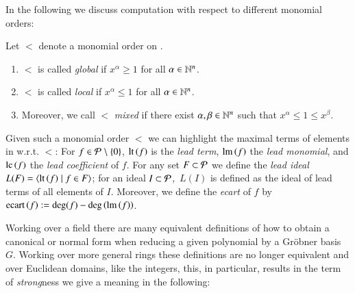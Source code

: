 In the following we discuss computation with respect to different monomial orders:
\begin{definition}
Let $<$ denote a monomial order on \epr. 
\begin{enumerate}
\item $<$ is called \emph{global} if $x^\alpha \geq 1$ for all $\alpha \in \mathbb{N}^n$.
\item $<$ is called \emph{local} if $x^\alpha \leq 1$ for all $\alpha \in \mathbb{N}^n$.
\item Moreover, we call $<$ \emph{mixed} if there exist $\alpha, \beta \in \mathbb{N}^n$ such
that $x^\alpha \leq 1 \leq x^\beta$.
\end{enumerate}
\end{definition}
Given such a monomial order $<$ we can highlight the maximal terms of
elements in \epr w.r.t. $<$: For $f\in \mathcal{P}\ \backslash\ \{0\}$,
$\operatorname{lt}\left({f}\right)$ is the \emph{lead term}, $\operatorname{lm}\left({f}\right)$ the \emph{lead monomial}, and $\mathrm{lc}\left({f}\right)$
the \emph{lead coefficient} of $f$. For any set $F \subset \mathcal{P}$ we define
the \emph{lead ideal} $L(F) = \langle \operatorname{lt}\left({f}\right) \mid f \in F\rangle$; for an ideal
$I \subset \mathcal{P}$,\  $L(I)$ is defined as the ideal of lead terms of all elements of
$I$. Moreover, we define the \emph{ecart} of $f$ by $\mathrm{ecart}\left({f}\right) := \deg(f) -
\deg\left(\operatorname{lm}\left({f}\right)\right)$. 

Working over a field there are many equivalent definitions of how to obtain a
canonical or normal form when reducing a given polynomial by a Gr\"obner basis $G$.
Working over more general rings these definitions are no longer equivalent and
over Euclidean domains, like the integers, this, in particular, results in the term
of \emph{strong}ness we give a meaning in the following:

